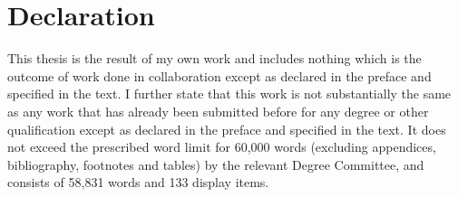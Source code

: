 \chapter{Declaration}
This thesis is the result of my own work and includes nothing which is the outcome of work done in collaboration except as declared in the preface and specified in the text. I further state that this work is not substantially the same as any work that has already been submitted before for any degree or other qualification except as declared in the preface and specified in the text. It does not exceed the prescribed word limit for 60,000 words (excluding appendices, bibliography, footnotes and tables) by the relevant Degree Committee, and consists of 58,831 words and 133 display items.



